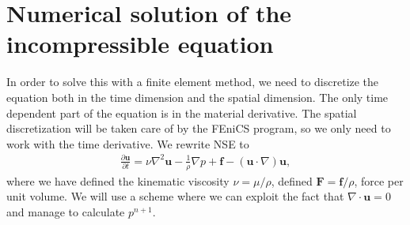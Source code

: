 \documentclass[a4paper,10pt]{article}
\renewcommand{\vec}[1]{\mathbf{#1}}
\renewcommand{\(}{\left(}
\renewcommand{\)}{\right)}
\newcommand{\dpart}[2]{\frac{\partial#1}{\partial#2}}
\begin{document}
\section{Numerical solution of the incompressible equation}
In order to solve this with a finite element method, we need to discretize the equation both in the time dimension and the spatial dimension. The only time dependent part of the equation is in the material derivative. The spatial discretization will be taken care of by the FEniCS program, so we only need to work with the time derivative. We rewrite NSE to
\begin{align*}
  \dpart{\vec u}{t} = \nu\nabla^2\vec u - \frac{1}{\rho}\nabla p + \vec f - (\vec u\cdot \nabla)\vec u,
\end{align*}
where we have defined the kinematic viscosity $\nu=\mu/\rho$, defined $\vec F = \vec f/\rho$, force per unit volume. We will use a scheme where we can exploit the fact that $\nabla \cdot \vec u = 0$ and manage to calculate $p^{n+1}$.
\end{document}
